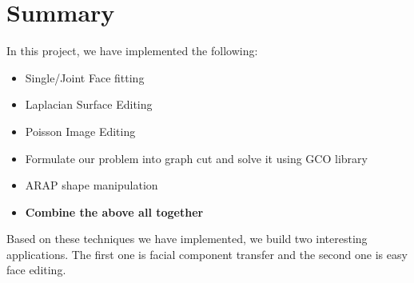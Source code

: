\section{Summary}
In this project, we have implemented the following:
\begin{itemize}
\item Single/Joint Face fitting \cite{yang2011expression}
\item Laplacian Surface Editing \cite{sorkine2004laplacian}
\item Poisson Image Editing \cite{perez2003poisson}
\item Formulate our problem into graph cut\cite{yang2011expression} and solve it using GCO library \cite{boykov2004experimental}
\item ARAP shape manipulation \cite{igarashi2005rigid}
\item \textbf{Combine the above all together}
\end{itemize}
Based on these techniques we have implemented, we build two interesting applications. The first one is facial component transfer and the second one is easy face editing.

 

    